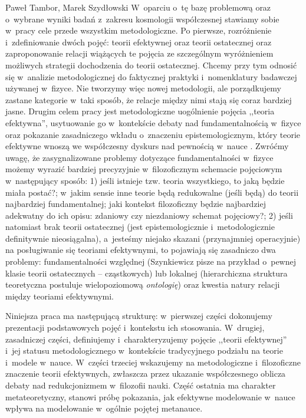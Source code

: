 \begin{artplenv2auth}{Paweł Tambor, Marek Szydłowski}
W~oparciu o~tę bazę problemową oraz o~wybrane wyniki badań z~zakresu kosmologii współczesnej stawiamy sobie w~pracy cele przede wszystkim metodologiczne. Po pierwsze, rozróżnienie i~zdefiniowanie dwóch pojęć: teorii efektywnej oraz teorii ostatecznej oraz zaproponowanie relacji wiążących te pojęcia ze szczególnym wyróżnieniem możliwych strategii dochodzenia do teorii ostatecznej. Chcemy przy tym odnosić się w~analizie metodologicznej do faktycznej praktyki i~nomenklatury badawczej używanej w~fizyce. Nie tworzymy więc nowej metodologii, ale porządkujemy zastane kategorie w~taki sposób, że relacje między nimi stają się coraz bardziej jasne. Drugim celem pracy jest metodologiczne uogólnienie pojęcia ,,teoria efektywna'', usytuowanie go w~kontekście debaty nad fundamentalnością w~fizyce oraz pokazanie zasadniczego wkładu o~znaczeniu epistemologicznym, który teorie efektywne wnoszą we współczesny dyskurs nad pewnością w~nauce
\parencite[][]{szydlowski_model_2008}. %
 Zwróćmy uwagę, że zasygnalizowane problemy dotyczące fundamentalności w~fizyce możemy wyrazić bardziej precyzyjnie w~filozoficznym schemacie pojęciowym w~następujący sposób: 1) jeśli istnieje tzw. teoria wszystkiego, to jaką będzie miała postać?; w~jakim sensie inne teorie będą redukowalne (jeśli będą) do teorii najbardziej fundamentalnej; jaki kontekst filozoficzny będzie najbardziej adekwatny do ich opisu: zdaniowy czy niezdaniowy schemat pojęciowy?; 2) jeśli natomiast brak teorii ostatecznej (jest epistemologicznie i~metodologicznie definitywnie nieosiągalna), a~jesteśmy niejako skazani (przynajmniej operacyjnie) na posługiwanie się teoriami efektywnymi, to pojawiają się zasadniczo dwa problemy: fundamentalności względnej (Szynkiewicz pisze na przykład o~pewnej klasie teorii ostatecznych -- cząstkowych) lub lokalnej (hierarchiczna struktura teoretyczna postuluje wielopoziomową \textit{ontologię}) oraz kwestia natury relacji między teoriami efektywnymi.

Niniejsza praca ma następującą strukturę: w~pierwszej części dokonujemy prezentacji podstawowych pojęć i~kontekstu ich stosowania. W~drugiej, zasadniczej części, definiujemy i~charakteryzujemy pojęcie ,,teorii efektywnej'' i~jej statusu metodologicznego w~kontekście tradycyjnego podziału na teorie i~modele w~nauce. W~części trzeciej wskazujemy na metodologiczne i~filozoficzne znaczenie teorii efektywnych, zwłaszcza przez ukazanie współczesnego oblicza debaty nad redukcjonizmem w~filozofii nauki. Część ostatnia ma charakter metateoretyczny, stanowi próbę pokazania, jak efektywne modelowanie w~nauce wpływa na modelowanie w~ogólnie pojętej metanauce.


\end{artplenv2auth}
